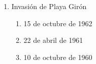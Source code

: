 \documentclass[twocolumn]{article}
\begin{document}
\begin{enumerate}
\begin{enumerate}
  \end{enumerate}



  \item Invasión de Playa Girón

  \begin{enumerate}
   
   \item 15 de octubre de 1962
   
   \item 22 de abril de 1961
   
   \item 10 de octubre de 1960
   
  \end{enumerate}


\end{enumerate}


\end{document}
